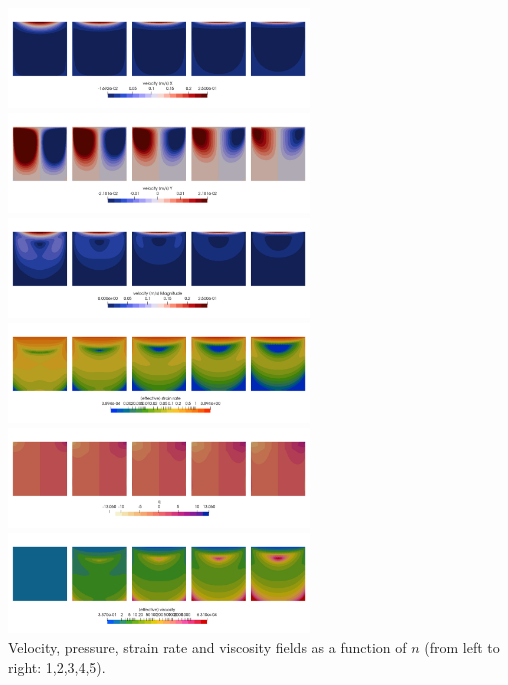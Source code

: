 \begin{center}
\includegraphics[width=8cm]{python_codes/fieldstone_87/results/experiment_01/meth3/u.png}
\includegraphics[width=8cm]{python_codes/fieldstone_87/results/experiment_01/meth3/v.png}\\
\includegraphics[width=8cm]{python_codes/fieldstone_87/results/experiment_01/meth3/vel.png}
\includegraphics[width=8cm]{python_codes/fieldstone_87/results/experiment_01/meth3/sr.png}\\
\includegraphics[width=8cm]{python_codes/fieldstone_87/results/experiment_01/meth3/press.png}
\includegraphics[width=8cm]{python_codes/fieldstone_87/results/experiment_01/meth3/eta.png}\\
{\captionfont Velocity, pressure, strain rate and viscosity fields as a function 
of $n$ (from left to right: 1,2,3,4,5).} 
\end{center}

